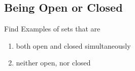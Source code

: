 \subsection{Being Open or Closed}
\begin{majorEx} %
  Find Examples of sets that are 
  \begin{enumerate}
  \item both open and closed simultaneously
  \item neither open, nor closed
  \end{enumerate}
\end{majorEx}

\begin{minorEx} %
\end{minorEx}

\begin{majorEx} %
\end{majorEx}

